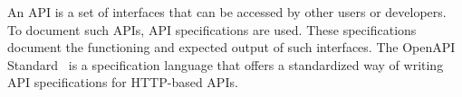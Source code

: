 An API is a set of interfaces that can be accessed by other users or developers.
To document such APIs, API specifications are used.
These specifications document the functioning and expected output of such interfaces.
The OpenAPI Standard~\cite{} is a specification language that offers a standardized way of writing API specifications for HTTP-based APIs.
